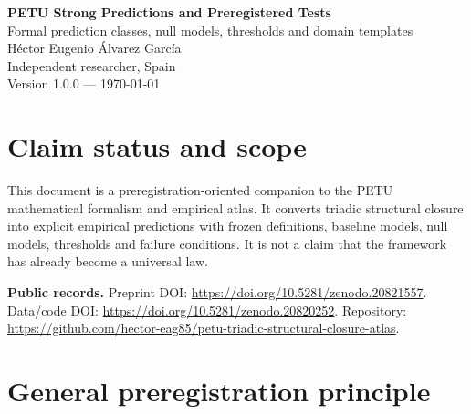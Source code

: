 \documentclass[11pt,a4paper]{article}
\newcommand{\Hraw}{H_{\mathrm{raw}}}
\newcommand{\Hstr}{H_{\mathrm{structured}}}
\begin{document}
\begin{center}
{\LARGE \textbf{PETU Strong Predictions and Preregistered Tests}}\\[0.4em]
{\large Formal prediction classes, null models, thresholds and domain templates}\\[0.7em]
Héctor Eugenio Álvarez García\\
Independent researcher, Spain\\
Version 1.0.0 --- \today
\end{center}

\section*{Claim status and scope}

This document is a preregistration-oriented companion to the PETU mathematical formalism and empirical atlas.
It converts triadic structural closure into explicit empirical predictions with frozen definitions, baseline models, null models, thresholds and failure conditions.
It is not a claim that the framework has already become a universal law.

\textbf{Public records.} Preprint DOI: \url{https://doi.org/10.5281/zenodo.20821557}.
Data/code DOI: \url{https://doi.org/10.5281/zenodo.20820252}.
Repository: \url{https://github.com/hector-eag85/petu-triadic-structural-closure-atlas}.

\begin{abstract}
This document defines strong predictions and preregistered test families for triadic structural closure.
The framework predicts that coherent natural systems can often be represented by the integrated relation of support $(H)$, structure $(S)$ and linkage $(L)$, with system-level closure denoted by $\Phi$.
The document specifies prediction classes, model hierarchies, null models, baseline comparisons, threshold rules, reporting metrics, falsification criteria and domain-specific preregistration templates.
It distinguishes internal closure reconstruction from external endpoint prediction and requires separation of raw support $\Hraw$ from structured support $\Hstr$ wherever support may already contain structural information.
\end{abstract}

\section{General preregistration principle}
\end{document}
